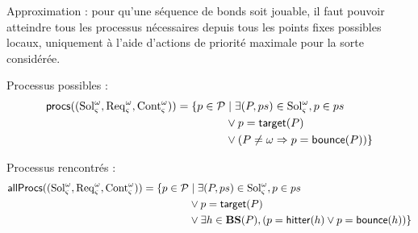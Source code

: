 

\newcommand{\abstr}[1]{#1^\wedge}%
\def\BS{\mathbf{BS}}
\def\procs{\mathsf{procs}}
\def\allprocs{\mathsf{allProcs}}
\def\pfp{\mathsf{pfp}}
\def\pfpprocs{\mathsf{pfpProcs}}

\def\ctx{\varsigma}
\def\w{\omega}
\def\aBS{\abstr{\BS}}

\def\Req{\mathrm{Req}}
\def\Sol{\mathrm{Sol}}
\def\Cont{\mathrm{Cont}}
\def\A{\mathcal{A}}
\def\cwA{\A_\ctx^\w}
\def\cwReq{\Req_\ctx^\w}
\def\cwSol{\Sol_\ctx^\w}
\def\cwCont{\Cont_\ctx^\w}

\def\aB{\mathcal{B}}
\def\sat#1{\lceil #1\rceil}
\def\cwB{\sat{\aB_\ctx^\w}}
\def\mycwB#1#2{\sat{\aB_{#1}^{#2}}}
\def\Bsol{\sat{\Sol^\w_\ctx}}
\def\Breq{\sat{\Req^\w_\ctx}}
\def\Bcont{\sat{\Cont^\w_\ctx}}

\def\myB{\aB^\w_\ctx}
\def\mysol{\overline{\Sol^\w_\ctx}}
\def\myreq{\overline{\Req^\w_\ctx}}
\def\mycont{\overline{\Cont^\w_\ctx}}


\def\PHobjp#1#2#3{\PHobj{{#1}_{#2}}{{#1}_{#3}}}
\def\Obj{\mathbf{Obj}}
\def\powerset{\wp}
\def\gCont{\f{maxCont}}
\def\w{\omega}

Approximation : pour qu'une séquence de bonds soit jouable, il faut pouvoir atteindre tous les processus nécessaires depuis tous les points fixes possibles locaux, uniquement à l'aide d'actions de priorité maximale pour la sorte considérée.




Processus possibles :
\begin{align*}
\procs((\cwSol,\cwReq,\cwCont)) = \{ p \in \PHproc &\mid \exists (P,ps) \in \cwSol, p \in ps
\\ & \vee p = \PHtarget(P)
\\ & \vee (P \neq \omega \Rightarrow p = \PHbounce(P)) \}
\end{align*}

Processus rencontrés :
\begin{align*}
\allprocs((\cwSol,\cwReq,\cwCont)) = \{ p \in \PHproc &\mid \exists (P,ps) \in \cwSol, p \in ps
\\ & \vee p = \PHtarget(P)
\\ & \vee \exists h \in \BS(P), (p = \PHhitter(h) \vee p = \PHbounce(h)) \}
\end{align*}

